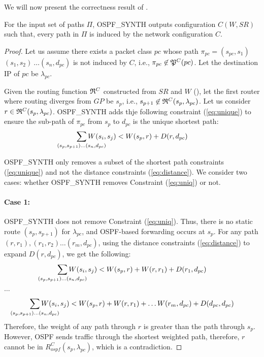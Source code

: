 
We will now present the correctness result of . 
\begin{theorem}[Correctness]
	For the input set of paths $\Pi$, {\small \sc OSPF_SYNTH} outputs
	configuration $C(W,SR)$ such that, every path in $\Pi$ is
	induced by the network configuration $C$. 
\end{theorem}
\begin{proof}
Let us assume there exists a packet class $pc$ whose path $\pi_{pc} =
(s_{pc}, s_1)$ $ (s_1, s_2) \
\ldots (s_n, d_{pc})$ is not induced by $C$, i.e.,
$\pi_{pc} \not\in \mathfrak{P}^C(pc)$. Let the destination IP of $pc$ be
$\lambda_{pc}$.

Given the routing function $\mathfrak{R}^C$ constructed from $SR$ and
$W$ (), let the first router where routing diverges from $GP$ be $s_p$, i.e.,  
$s_{p+1} \not\in \mathfrak{R}^C(s_{p}, \lambda_{pc})$. Let us consider  $r \in \mathfrak{R}^C(s_{p}, \lambda_{pc})$.  
{\small \sc OSPF_SYNTH} adds thje following
constraint (\ref{eq:unique}) to ensure the sub-path of $\pi_{pc}$ 
from $s_{p}$ to $d_{pc}$ is the unique shortest path: 
\begin{equation} \label{eq:uniq}
\sum_{\mathclap{\substack{(s_{p},s_{p+1})\ldots(s_{n},d_{pc})}}} 
W(s_i, s_j) < W(s_{p}, r) + D(r, d_{pc})
\end{equation}

{\small \sc OSPF_SYNTH} 
only removes a subset of the shortest path 
constraints (\ref{eq:unique}) and 
not the distance constraints (\ref{eq:distance}). We consider 
two cases: whether {\small \sc OSPF_SYNTH} 
removes Constraint (\ref{eq:uniq}) or not. 

\paragraph{Case 1:} 
{\small \sc OSPF_SYNTH} does not remove Constraint (\ref{eq:uniq}). 
Thus, there is no static route $(s_p, s_{p+1})$ for
$\lambda_{pc}$, and OSPF-based forwarding occurs at $s_{p}$. 
For any path $(r, r_1), (r_1, r_2) \ldots (r_m, d_{pc})$, 
using the distance constraints (\ref{eq:distance}) to
expand $D(r, d_{pc})$, we get the following: 
\[
\sum_{\mathclap{\substack{(s_{p},s_{p+1})\ldots(s_{n},d_{pc})}}} 
W(s_i, s_j) < W(s_{p}, r) + W(r, r_{1}) + D(r_{1}, d_{pc})
\]
\begin{center}
	$\ldots$
\end{center}
\[
\sum_{\mathclap{\substack{(s_{p},s_{p+1})\ldots(s_{n},d_{pc})}}} 
W(s_i, s_j) < W(s_{p}, r) + W(r, r_{1}) + \ldots W(r_{m}, d_{pc}) + D(d_{pc}, d_{pc})
\]
Therefore, the weight of any path through $r$ is greater than 
the path through $s_{p}$. However, 
OSPF sends traffic through the shortest weighted
path, therefore, $r$ cannot be in $R^C_{ospf}(s_p, \lambda_{pc})$,
which is a contradiction. 


\end{proof}
